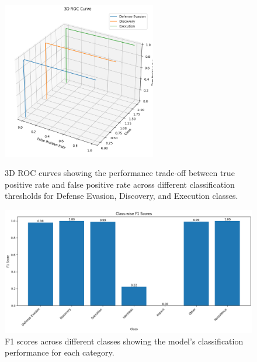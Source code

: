         \begin{figure}[h]
            \centering
            \begin{minipage}[c]{0.47\textwidth}
                \centering
                \includegraphics[width=0.6\textwidth]{../figures/plots/section4/3d_roc_curve.png}
                \caption{3D ROC curves showing the performance trade-off between true positive rate and false positive rate across different classification thresholds for Defense Evasion, Discovery, and Execution classes.}
                \label{fig:3d_roc}
            \end{minipage}
            \hfill
            \begin{minipage}[c]{0.47\textwidth}
                \centering
                \vspace{0.1cm}
                \includegraphics[width=\textwidth]{../figures/plots/section4/f1_scores.png}
                \caption{F1 scores across different classes showing the model's classification performance for each category.}
                \label{fig:f1_scores}
            \end{minipage}
        \end{figure}
        
